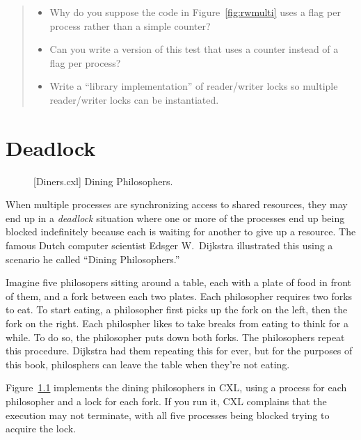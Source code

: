 \documentclass{report}
\newenvironment{code}{
\tcolorbox
}{
\endtcolorbox
}
\begin{document}
\begin{quote}
\begin{itemize}
\item Why do you suppose the code in Figure~\ref{fig:rwmulti} uses a flag
per process rather than a simple counter?
\item Can you write a version of this test that uses a counter instead
of a flag per process?
\item Write a ``library implementation'' of reader/writer locks so multiple
reader/writer locks can be instantiated.
\end{itemize}
\end{quote}

\chapter{Deadlock}

\begin{figure}
\begin{code}
\end{code}
\caption{[Diners.cxl] Dining Philosophers.}
\label{fig:diners}
\end{figure}

When multiple processes are synchronizing access to shared resources, they
may end up in a \emph{deadlock} situation where one or more of the processes
end up being blocked indefinitely because each is waiting for another to give
up a resource.
The famous Dutch computer scientist Edsger W.~Dijkstra illustrated this using
a scenario he called ``Dining Philosophers.''

Imagine five philosopers sitting around a table, each with a plate of food in
front of them, and a fork between each two plates.  Each philosopher requires
two forks to eat.  To start eating, a philosopher first picks up the fork on
the left, then the fork on the right.  Each philospher likes to take breaks
from eating to think for a while.  To do so, the philosopher puts down both
forks.  The philosophers repeat this procedure.  Dijkstra had them repeating
this for ever, but for the purposes of this book, philosphers can leave
the table when they're not eating.

Figure~\ref{fig:diners} implements the dining philosophers in CXL, using a
process for each philosopher and a lock for each fork.  If you
run it, CXL complains that the execution may not terminate, with all five
processes being blocked trying to acquire the lock.
\end{document}
